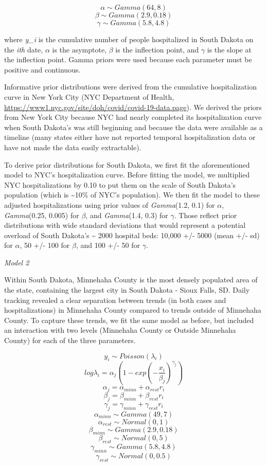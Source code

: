 \documentclass[
]{article}
\begin{document}
\[\alpha \sim Gamma(64,8)\]
\[\beta \sim Gamma(2.9, 0.18)\]
\[\gamma \sim Gamma(5.8,4.8)\]

where \emph{y\_i} is the cumulative number of people hospitalized in South Dakota on the \emph{ith} date, \(\alpha\) is the asymptote, \(\beta\) is the inflection point, and \(\gamma\) is the slope at the inflection point. Gamma priors were used because each parameter must be positive and continuous.

Informative prior distributions were derived from the cumulative hospitalization curve in New York City (NYC Department of Health, \url{https://www1.nyc.gov/site/doh/covid/covid-19-data.page}). We derived the priors from New York City because NYC had nearly completed its hospitalization curve when South Dakota's was still beginning and because the data were available as a timeline (many states either have not reported temporal hospitalization data or have not made the data easily extractable).

To derive prior distributions for South Dakota, we first fit the aforementioned model to NYC's hospitalization curve. Before fitting the model, we multiplied NYC hospitalizations by 0.10 to put them on the scale of South Dakota's population (which is \textasciitilde10\% of NYC's population). We then fit the model to these adjusted hospitalizations using prior values of \emph{Gamma}(1.2, 0.1) for \(\alpha\), \emph{Gamma}(0.25, 0.005) for \(\beta\), and \emph{Gamma}(1.4, 0.3) for \(\gamma\). Those reflect prior distributions with wide standard deviations that would represent a potential overload of South Dakota's \textasciitilde{} 2000 hospital beds: 10,000 +/- 5000 (mean +/- sd) for \(\alpha\), 50 +/- 100 for \(\beta\), and 100 +/- 50 for \(\gamma\).

\emph{Model 2}

Within South Dakota, Minnehaha County is the most densely populated area of the state, containing the largest city in South Dakota - Sioux Falls, SD. Daily tracking revealed a clear separation between trends (in both cases and hospitalizations) in Minnehaha County compared to trends outside of Minnehaha County. To capture these trends, we fit the same model as before, but included an interaction with two levels (Minnehaha County or Outside Minnehaha County) for each of the three parameters.

\[y_i \sim Poisson(\lambda_i)\]
\[log\lambda_i = \alpha_j(1 - exp(-\frac{x_i}{\beta_j})^{\gamma_j})\]
\[\alpha_j = \alpha_{minn} + \alpha_{rest}r_i\]
\[\beta_j = \beta_{minn} + \beta_{rest}r_i\]
\[\gamma_j = \gamma_{minn} + \gamma_{rest}r_i\]
\[\alpha_{minn} \sim Gamma(49,7)\]
\[\alpha_{rest} \sim Normal(0,1)\]
\[\beta_{minn} \sim Gamma(2.9, 0.18)\]
\[\beta_{rest} \sim Normal(0, 5)\]
\[\gamma_{minn} \sim Gamma(5.8, 4.8)\]
\[\gamma_{rest} \sim Normal(0,0.5)\]
\end{document}
